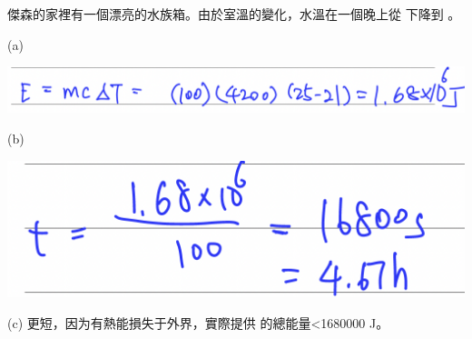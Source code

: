 {
    傑森的家裡有一個漂亮的水族箱。由於室溫的變化，水溫在一個晚上從 下降到 。
}{
    \sol\par (a){\par\centering\includegraphics[width=\textwidth]{./img/ch2_shc_lq_2024-05-16-10-33-07.png}\par}
    \par (b){\par\centering\includegraphics[width=.55\textwidth]{./img/ch2_shc_lq_2024-05-16-10-33-24.png}\par}
    \par (c) 更短，因为有熱能損失于外界，實際提供 的總能量<1680000 J。
}

